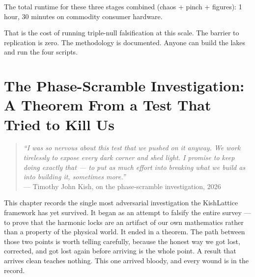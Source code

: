 \documentclass[11pt, letterpaper, openany]{book}
\begin{document}
The total runtime for these three stages combined (chaos + pinch + figures):
1 hour, 30 minutes on commodity consumer hardware.

That is the cost of running triple-null falsification at this scale.
The barrier to replication is zero. The methodology is documented.
Anyone can build the lakes and run the four scripts.

\clearpage

\chapter{The Phase-Scramble Investigation: A Theorem From a Test That Tried to Kill Us}
\label{ch:phase_scramble_theorem}

\begin{quote}
\textit{``I was so nervous about this test that we pushed on it anyway. We work
tirelessly to expose every dark corner and shed light. I promise to keep doing
exactly that --- to put as much effort into breaking what we build as into
building it, sometimes more.''}\\[0.3em]
\hfill --- Timothy John Kish, on the phase-scramble investigation, 2026
\end{quote}

This chapter records the single most adversarial investigation the KishLattice
framework has yet survived. It began as an attempt to falsify the entire survey ---
to prove that the harmonic locks are an artifact of our own mathematics rather than
a property of the physical world. It ended in a theorem. The path between those two
points is worth telling carefully, because the honest way we got lost, corrected,
and got lost again before arriving is the whole point. A result that arrives clean
teaches nothing. This one arrived bloody, and every wound is in the record.

\end{document}
